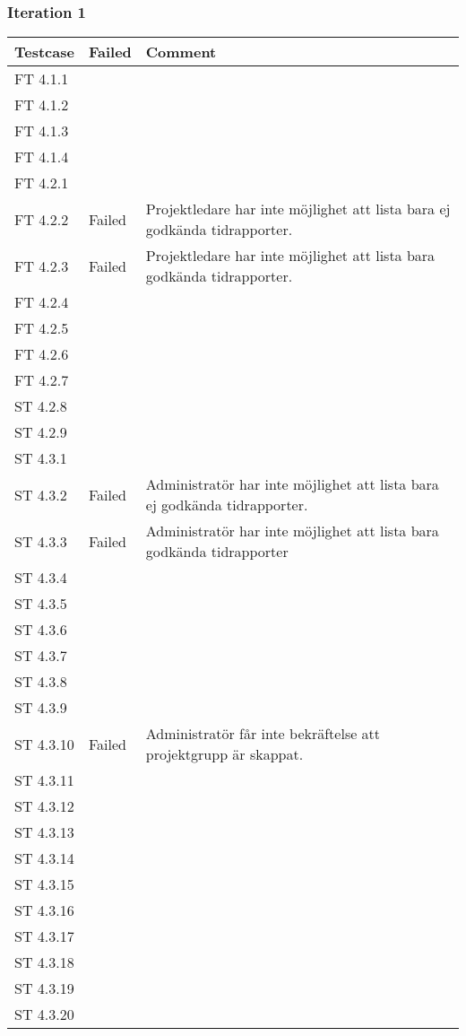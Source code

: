 \documentclass[a4paper]{article}
\begin{document}
\subsubsection{Iteration 1}
\begin{tabular}{| l | l | p{11cm} |}
\hline
Testcase &  Failed & Comment\\
\hline
FT 4.1.1 & & \\
\hline
FT 4.1.2 & & \\
\hline
FT 4.1.3 & & \\
\hline
FT 4.1.4 & & \\
\hline
FT 4.2.1 & & \\
\hline
FT 4.2.2 & Failed & Projektledare har inte möjlighet att lista bara ej godkända tidrapporter.\\
\hline
FT 4.2.3 & Failed & Projektledare har inte möjlighet att lista bara godkända tidrapporter.\\
\hline
FT 4.2.4 & & \\
\hline
FT 4.2.5 & & \\
\hline
FT 4.2.6 & & \\
\hline
FT 4.2.7 & & \\
\hline
ST 4.2.8 & & \\
\hline
ST 4.2.9 & & \\
\hline
ST 4.3.1 & & \\
\hline
ST 4.3.2 & Failed & Administratör har inte möjlighet att lista bara ej godkända tidrapporter. \\
\hline
ST 4.3.3 & Failed & Administratör har inte möjlighet att lista bara godkända tidrapporter\\
\hline
ST 4.3.4 & & \\
\hline
ST 4.3.5 & & \\
\hline
ST 4.3.6 & & \\
\hline
ST 4.3.7 & & \\
\hline
ST 4.3.8 & & \\
\hline
ST 4.3.9 & & \\
\hline
ST 4.3.10 & Failed & Administratör får inte bekräftelse att projektgrupp är skappat. \\
\hline
ST 4.3.11 & & \\
\hline
ST 4.3.12 & & \\
\hline
ST 4.3.13 & & \\
\hline
ST 4.3.14 & & \\
\hline
ST 4.3.15 & & \\
\hline
ST 4.3.16 & & \\
\hline
ST 4.3.17 & & \\
\hline
ST 4.3.18 & & \\
\hline
ST 4.3.19 & & \\
\hline
ST 4.3.20 & & \\
\end{tabular}
\end{document}
